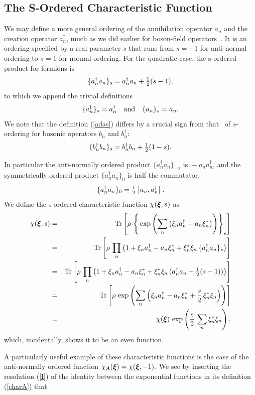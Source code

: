 \documentclass[12pt]{article}
\def\beq{\begin{equation}}
\def\eeq{\end{equation}}
\def\bea{\begin{eqnarray}}
\def\eea{\end{eqnarray}}
\def\ad{a^\dgr}
\def\x{\xi}
\def\bx{{\mbox{\boldmath$\xi$}}}
\def\xs{\xi^*}
\def\dgr{\dagger}
\def\Tr{{\rm Tr}}
\def\thalf{\textstyle{ {1 \over 2} } }
\def\op{operator }
\def\ops{operators }
\def\ani{annihilation }
\def\cre{creation }
\def\and{\quad {\hbox \mathrm{and}} \quad}
\begin{document}
\subsection{The S-Ordered Characteristic Function}
We may define a more general ordering
of the \ani \op $ a_n $ and the \cre \op $ a^\dgr_n $,
much as we did earlier for boson-field operators~\cite{kcrg1}.
It is an ordering specified by a real parameter $ s $
that runs from $ s = - 1 $ for anti-normal ordering
to $ s = 1 $ for normal ordering.
For the quadratic case, the s-ordered product 
for fermions is
\beq
\{ a^\dgr_n a_n \}_s = a^\dgr_n a_n + \thalf ( s - 1 ) ,
\label {adas}
\eeq
to which we append the trivial definitions
\beq
\{ a^\dgr_n \}_s = a^\dgr_n 
\and
\{ a_n \}_s = a_n .
\label {trivdef}
\eeq
We note that the definition (\ref {adas})
differs by a crucial sign from that~\cite{kcrg1}
of $s$-ordering for bosonic \ops
$ b_n $ and $ b^\dgr_n $:
\beq
\{ b^\dgr_n b_n \}_s = b^\dgr_n b_n + \thalf ( 1 - s ) .
\label {adasb}
\eeq
\par
In particular the anti-normally ordered product
$ \{ a^\dgr_n a_n \}_{-1} $ is $ \mbox{} - a_n a^\dgr_n $,
and the symmetrically ordered product
$ \{ a^\dgr_n a_n \}_0 $ is half the commutator,
\beq
 \{ a^\dgr_n a_n \}_0 = \thalf \left[ a_n , \ad_n \right] .
\label {aa0}
\eeq
We define the s-ordered characteristic function
$ \chi ( \bx , s ) $ as
\bea
\chi ( \bx , s ) & = & 
\Tr \left[ \rho
\, \left\{
\, \exp \left( \sum_n \left( \x_n a^\dgr_n - a_n \xs_n \right) \right)
\right\}_s
\right] \\
& = &
\Tr \left[
\rho \, \prod_n \left(
1 + \x_n a^\dgr_n - a_n \xs_n
+ \xs_n \x_n \, \{ a^\dgr_n a_n \}_s 
\right)
\right] \\
& = &
\Tr \left[
\rho \, \prod_n \left(
1 + \x_n a^\dgr_n - a_n \xs_n
+ \xs_n \x_n \, ( a^\dgr_n a_n + \thalf ( s - 1 ) )
\right)
\right] \\
& = & \Tr \left[
\rho
\, \exp \left( \sum_n \left( \x_n a^\dgr_n - a_n \xs_n 
+ \frac{ s }{ 2 } \, \xs_n \x_n \right) \right)
\right] \\
& = & \chi ( \bx ) \, 
\exp\left( \frac{ s }{ 2 } \, \sum_n \xs_n \x_n \right) ,
\label {chars}
\eea
which, incidentally, shows it to be an even function.
\par
A particularly useful example of these characteristic functions
is the case of the anti-normally ordered function
$ \chi_A ( \bx ) = \chi( \bx , -1 ) $.
We see by inserting the resolution (\ref {I})
of the identity between the exponential functions
in its definition (\ref {charA}) that 
\end{document}
